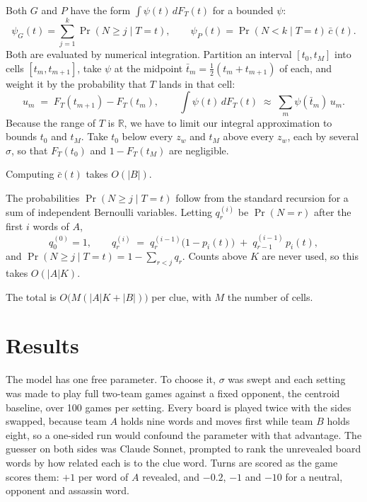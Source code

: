 \documentclass[12pt]{article}
\begin{document}
Both $G$ and $P$ have the form $\int \psi(t)\, dF_T(t)$ for a bounded $\psi$:
\[ \psi_G(t) = \sum_{j=1}^{k} \Pr(N \ge j \mid T = t), \qquad
   \psi_P(t) = \Pr(N < k \mid T = t)\, \bar c(t). \]
Both are evaluated by numerical integration. Partition an interval
$[t_0, t_M]$ into cells $[t_m, t_{m+1}]$, take $\psi$ at the midpoint
$\bar t_m = \tfrac{1}{2}(t_m + t_{m+1})$ of each, and weight it by the
probability that $T$ lands in that cell:
\[ u_m \;=\; F_T(t_{m+1}) - F_T(t_m), \qquad
   \int \psi(t) \, dF_T(t) \;\approx\; \sum_m \psi(\bar t_m)\, u_m. \]
Because the range of $T$ is $\mathbb{R}$, we have to limit our integral approximation to bounds $t_0$ and $t_M$. Take $t_0$ below every $z_w$ and $t_M$ above every $z_w$, each by several
$\sigma$, so that $F_T(t_0)$ and $1 - F_T(t_M)$ are negligible. 

Computing $\bar c(t)$ takes $O(|B|)$. 

The probabilities $\Pr(N \ge j \mid T = t)$ follow from
the standard recursion for a sum of independent Bernoulli variables. Letting
$q^{(i)}_r$ be $\Pr(N = r)$ after the first $i$ words of $A$,
\[ q^{(0)}_0 = 1, \qquad
   q^{(i)}_r \;=\; q^{(i-1)}_r\bigl(1 - p_i(t)\bigr)
                \;+\; q^{(i-1)}_{r-1}\,p_i(t), \]
and $\Pr(N \ge j \mid T = t) = 1 - \sum_{r < j} q_r$. Counts above $K$
are never used, so this takes $O(|A|K)$.

The total is $O\bigl(M(|A|K + |B|)\bigr)$ per clue, with $M$ the number of
cells. 

\section{Results}
\label{sec:results}

The model has one free parameter. To choose it, $\sigma$ was swept and each
setting was made to play full two-team games against a fixed opponent, the
centroid baseline, over 100 games per setting. Every board is played twice with
the sides swapped, because team $A$ holds nine words and moves first while team
$B$ holds eight, so a one-sided run would confound the parameter with that
advantage. The guesser on both sides was Claude Sonnet, prompted to rank the
unrevealed board words by how related each is to the clue word. Turns are scored
as the game scores them: $+1$ per word of $A$ revealed, and $-0.2$, $-1$ and
$-10$ for a neutral, opponent and assassin word.
\end{document}
